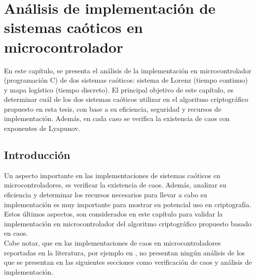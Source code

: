 
\chapter{Análisis de implementación de sistemas caóticos en microcontrolador}
En este capítulo, se presenta el análisis de la implementación en microcontrolador (programación C) de dos sistemas caóticos: sistema de Lorenz (tiempo continuo) y mapa logístico (tiempo discreto). El principal objetivo de este capítulo, es determinar cuál de los dos sistemas caóticos utilizar en el algoritmo criptográfico propuesto en esta tesis, con base a su eficiencia, seguridad y recursos de implementación. Además, en cada caso se verifica la existencia de caos con exponentes de Lyapunov.   

\section{Introducción}
Un aspecto importante en las implementaciones de sistemas caóticos en microcontroladores, es verificar la existencia de caos. Además, analizar su eficiencia y determinar los recursos necesarios para llevar a cabo su implementación es muy importante para mostrar su potencial uso en criptografía. Estos últimos aspectos, son considerados en este capítulo para validar la implementación en microcontrolador del algoritmo criptográfico propuesto basado en caos. \\

Cabe notar, que en las implementaciones de caos en microcontroladores reportadas en la literatura, por ejemplo en \cite{A-SEtAl_2011, SyJ_2011, V_2013, CEtAl_2013}, no presentan ningún análisis de los que se presentan en las siguientes secciones como verificación de caos y análisis de implementación.

